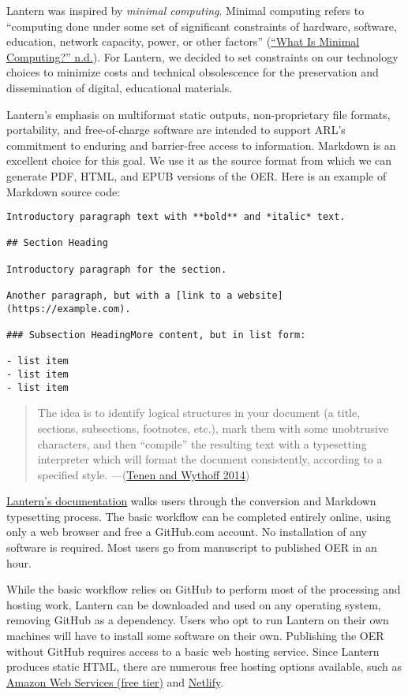 \documentclass[
  11pt,
  openany]{book}
\begin{document}
Lantern was inspired by \emph{minimal computing}. Minimal computing refers to
``computing done under some set of significant constraints of hardware,
software, education, network capacity, power, or other factors''
(\protect\hyperlink{ref-noauthor_what_nodate}{{``What Is {Minimal}
{Computing}?''} n.d.}). For Lantern, we decided to set constraints on our
technology choices to minimize costs and technical obsolescence for the
preservation and dissemination of digital, educational materials.

Lantern's emphasis on multiformat static outputs, non-proprietary file
formats, portability, and free-of-charge software are intended to support
ARL's commitment to enduring and barrier-free access to information. Markdown
is an excellent choice for this goal. We use it as the source format from
which we can generate PDF, HTML, and EPUB versions of the OER. Here is an
example of Markdown source code:

\begin{verbatim}
Introductory paragraph text with **bold** and *italic* text.

## Section Heading

Introductory paragraph for the section.

Another paragraph, but with a [link to a website](https://example.com).

### Subsection HeadingMore content, but in list form:

- list item
- list item
- list item
\end{verbatim}

\begin{quote}
The idea is to identify logical structures in your document (a title,
sections, subsections, footnotes, etc.), mark them with some unobtrusive
characters, and then ``compile'' the resulting text with a typesetting
interpreter which will format the document consistently, according to a
specified style. ---(\protect\hyperlink{ref-tenen_sustainable_2014}{Tenen and
Wythoff 2014})
\end{quote}

\href{https://github.com/nulib-oer/lantern/wiki}{Lantern's documentation}
walks users through the conversion and Markdown typesetting process. The basic
workflow can be completed entirely online, using only a web browser and free a
GitHub.com account. No installation of any software is required. Most users go
from manuscript to published OER in an hour.

While the basic workflow relies on GitHub to perform most of the processing
and hosting work, Lantern can be downloaded and used on any operating system,
removing GitHub as a dependency. Users who opt to run Lantern on their own
machines will have to install some software on their own. Publishing the OER
without GitHub requires access to a basic web hosting service. Since Lantern
produces static HTML, there are numerous free hosting options available, such
as
\href{https://aws.amazon.com/free/?all-free-tier.sort-by=item.additionalFields.SortRank\&all-free-tier.sort-order=asc\&awsf.Free\%20Tier\%20Types=*all\&awsf.Free\%20Tier\%20Categories=*all}{Amazon
Web Services (free tier)} and \href{https://app.netlify.com/drop}{Netlify}.
\end{document}
